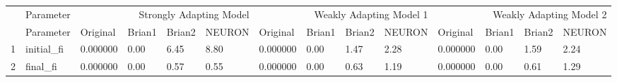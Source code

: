 \begin{tabular}{llllllllllllll}
 & Parameter & \multicolumn{4}{r}{Strongly Adapting Model} & \multicolumn{4}{r}{Weakly Adapting Model 1} & \multicolumn{4}{r}{Weakly Adapting Model 2} \\
 & Parameter & Original & Brian1 & Brian2 & NEURON & Original & Brian1 & Brian2 & NEURON & Original & Brian1 & Brian2 & NEURON \\
1 & initial_fi & 0.000000 & 0.00 & 6.45 & 8.80 & 0.000000 & 0.00 & 1.47 & 2.28 & 0.000000 & 0.00 & 1.59 & 2.24 \\
2 & final_fi & 0.000000 & 0.00 & 0.57 & 0.55 & 0.000000 & 0.00 & 0.63 & 1.19 & 0.000000 & 0.00 & 0.61 & 1.29 \\
\end{tabular}
